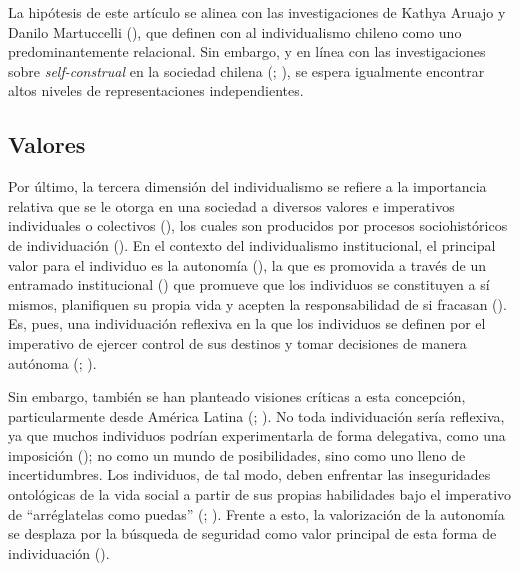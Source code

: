 \documentclass[
  letterpaper,
  DIV=11,
  numbers=noendperiod]{scrartcl}
\begin{document}
La hipótesis de este artículo se alinea con las investigaciones de
Kathya Aruajo y Danilo Martuccelli (),
que definen con al individualismo chileno como uno predominantemente
relacional. Sin embargo, y en línea con las investigaciones sobre
\emph{self-construal} en la sociedad chilena
(;
), se espera
igualmente encontrar altos niveles de representaciones independientes.

\subsection{Valores}\label{valores}

Por último, la tercera dimensión del individualismo se refiere a la
importancia relativa que se le otorga en una sociedad a diversos valores
e imperativos individuales o colectivos
(), los cuales son
producidos por procesos sociohistóricos de individuación
(). En el contexto del
individualismo institucional, el principal valor para el individuo es la
autonomía (), la que es
promovida a través de un entramado institucional
() que promueve que los
individuos se constituyen a sí mismos, planifiquen su propia vida y
acepten la responsabilidad de si fracasan
(). Es, pues, una individuación
reflexiva en la que los individuos se definen por el imperativo de
ejercer control de sus destinos y tomar decisiones de manera autónoma
(;
).

Sin embargo, también se han planteado visiones críticas a esta
concepción, particularmente desde América Latina
(;
). No toda individuación sería
reflexiva, ya que muchos individuos podrían experimentarla de forma
delegativa, como una imposición (); no como un mundo de posibilidades, sino como uno lleno
de incertidumbres. Los individuos, de tal modo, deben enfrentar las
inseguridades ontológicas de la vida social a partir de sus propias
habilidades bajo el imperativo de ``arréglatelas como puedas''
(;
). Frente a esto, la valorización
de la autonomía se desplaza por la búsqueda de seguridad como valor
principal de esta forma de individuación
().
\end{document}
